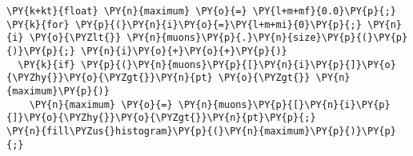 \begin{Verbatim}[commandchars=\\\{\}]
\PY{k+kt}{float} \PY{n}{maximum} \PY{o}{=} \PY{l+m+mf}{0.0}\PY{p}{;}
\PY{k}{for} \PY{p}{(}\PY{n}{i}\PY{o}{=}\PY{l+m+mi}{0}\PY{p}{;} \PY{n}{i} \PY{o}{\PYZlt{}} \PY{n}{muons}\PY{p}{.}\PY{n}{size}\PY{p}{(}\PY{p}{)}\PY{p}{;} \PY{n}{i}\PY{o}{+}\PY{o}{+}\PY{p}{)}
  \PY{k}{if} \PY{p}{(}\PY{n}{muons}\PY{p}{[}\PY{n}{i}\PY{p}{]}\PY{o}{\PYZhy{}}\PY{o}{\PYZgt{}}\PY{n}{pt} \PY{o}{\PYZgt{}} \PY{n}{maximum}\PY{p}{)}
    \PY{n}{maximum} \PY{o}{=} \PY{n}{muons}\PY{p}{[}\PY{n}{i}\PY{p}{]}\PY{o}{\PYZhy{}}\PY{o}{\PYZgt{}}\PY{n}{pt}\PY{p}{;}
\PY{n}{fill\PYZus{}histogram}\PY{p}{(}\PY{n}{maximum}\PY{p}{)}\PY{p}{;}
\end{Verbatim}
